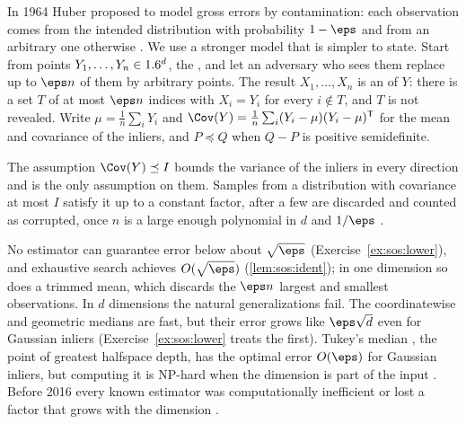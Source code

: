 \begin{refsection}
In 1964 Huber proposed to model gross errors by contamination: each observation comes from the intended distribution with probability $1-\eps$ and from an arbitrary one otherwise \parencite{Huber1964}. We use a stronger model that is simpler to state. Start from points $Y_1,\dots,Y_n\in1.6^d$, the , and let an adversary who sees them replace up to $\eps n$ of them by arbitrary points. The result $X_1,\dots,X_n$ is an  of $Y$: there is a set $T$ of at most $\eps n$ indices with $X_i=Y_i$ for every $i\notin T$, and $T$ is not revealed. Write $\mu=\frac1n\sum_iY_i$ and $\Cov(Y)=\frac1n\sum_i(Y_i-\mu)(Y_i-\mu)^{\mathsf T}$ for the mean and covariance of the inliers, and $P\preceq Q$ when $Q-P$ is positive semidefinite.


The assumption $\Cov(Y)\preceq I$ bounds the variance of the inliers in every direction and is the only assumption on them. Samples from a distribution with covariance at most $I$ satisfy it up to a constant factor, after a few are discarded and counted as corrupted, once $n$ is a large enough polynomial in $d$ and $1/\eps$ \parencite{DiakonikolasKane2023}.

No estimator can guarantee error below about $\sqrt\eps$ (Exercise~\ref{ex:sos:lower}), and exhaustive search achieves $O(\sqrt\eps)$ (\cref{lem:sos:ident}); in one dimension so does a trimmed mean, which discards the $\eps n$ largest and smallest observations. In $d$ dimensions the natural generalizations fail. The coordinatewise and geometric medians are fast, but their error grows like $\eps\sqrt d$ even for Gaussian inliers (Exercise~\ref{ex:sos:lower} treats the first). Tukey's median \parencite{Tukey1975}, the point of greatest halfspace depth, has the optimal error $O(\eps)$ for Gaussian inliers, but computing it is NP-hard when the dimension is part of the input \parencite{DiakonikolasKane2023}. Before 2016 every known estimator was computationally inefficient or lost a factor that grows with the dimension \parencite{Diakonikolas2016}.


\end{refsection}

